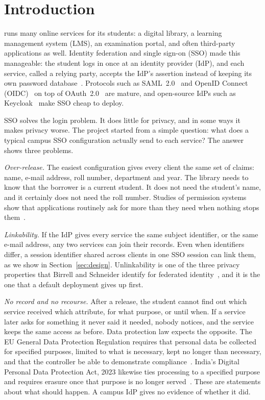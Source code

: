 \section{Introduction}
\label{sec:intro}

 runs many online services for its students: a digital library, a learning management system (LMS), an examination portal, and often third-party applications as well. Identity federation and single sign-on (SSO) made this manageable: the student logs in once at an identity provider (IdP), and each service, called a relying party, accepts the IdP's assertion instead of keeping its own password database~\cite{birrell2013federated,ferdous2015dynamic}. Protocols such as SAML~2.0~\cite{saml2core} and OpenID Connect (OIDC)~\cite{oidccore} on top of OAuth~2.0~\cite{rfc6749} are mature, and open-source IdPs such as Keycloak~\cite{keycloakdocs} make SSO cheap to deploy.

SSO solves the login problem. It does little for privacy, and in some ways it makes privacy worse. The project started from a simple question: what does a typical campus SSO configuration actually send to each service? The answer shows three problems.

\emph{Over-release.} The easiest configuration gives every client the same set of claims: name, e-mail address, roll number, department and year. The library needs to know that the borrower is a current student. It does not need the student's name, and it certainly does not need the roll number. Studies of permission systems show that applications routinely ask for more than they need when nothing stops them~\cite{felt2011permissions,chen2014oauth}.

\emph{Linkability.} If the IdP gives every service the same subject identifier, or the same e-mail address, any two services can join their records. Even when identifiers differ, a session identifier shared across clients in one SSO session can link them, as we show in Section~\ref{sec:design}. Unlinkability is one of the three privacy properties that Birrell and Schneider identify for federated identity~\cite{birrell2013federated}, and it is the one that a default deployment gives up first.

\emph{No record and no recourse.} After a release, the student cannot find out which service received which attribute, for what purpose, or until when. If a service later asks for something it never said it needed, nobody notices, and the service keeps the same access as before. Data protection law expects the opposite. The EU General Data Protection Regulation requires that personal data be collected for specified purposes, limited to what is necessary, kept no longer than necessary, and that the controller be able to demonstrate compliance~\cite{gdpr2016}. India's Digital Personal Data Protection Act, 2023 likewise ties processing to a specified purpose and requires erasure once that purpose is no longer served~\cite{dpdp2023}. These are statements about what should happen. A campus IdP gives no evidence of whether it did.

